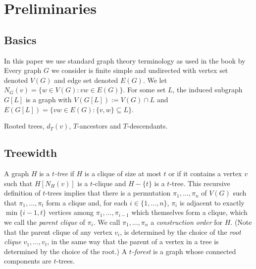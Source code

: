 \documentclass[kpfonts]{patmorin}
\newcommand{\uqs}{\chi_2}
\newcommand{\hus}{\hat{\chi}_2}
\theoremstyle{named}
\begin{document}
%
%
%

\section{Preliminaries}

\subsection{Basics}

In this paper we use standard graph theory terminology as used in the book by \citet{diestel:graph}
Every graph $G$ we consider is finite simple and undirected with vertex set denoted $V(G)$ and edge set denoted $E(G)$.  We let $N_G(v)=\{w\in V(G): vw\in E(G)\}$.  For some set $L$, the induced subgraph  $G[L]$ is a graph with $V(G[L]):=V(G)\cap L$ and $E(G[L])=\{vw\in E(G): \{v,w\}\subseteq L\}$.

Rooted trees, $d_T(v)$, $T$-ancestors and $T$-descendants.

\subsection{Treewidth}

A graph $H$ is a \emph{$t$-tree} if $H$ is a clique of size at most $t$ or if it contains a vertex $v$ such that $H[N_H(v)]$ is a $t$-clique and $H-\{t\}$ is a $t$-tree.  This recursive definition of $t$-trees implies that there is a permutation $\pi_1,\ldots,\pi_n$ of $V(G)$ such that $\pi_1,\ldots,\pi_t$ form a clique and, for each $i\in\{1,\ldots,n\}$, $\pi_i$ is adjacent to exactly $\min\{i-1,t\}$ vertices among $\pi_1,\ldots,\pi_{i-1}$ which themselves form a clique, which we call the \emph{parent clique} of $\pi_i$.  We call $\pi_1,\ldots,\pi_n$ a \emph{construction order} for $H$.  (Note that the parent clique of any vertex $v_i$, is determined by the choice of the \emph{root clique} $v_1,\ldots,v_t$, in the same way that the parent of a vertex in a tree is determined by the choice of the root.)  A \emph{$t$-forest} is a graph whose connected components are $t$-trees.
\end{document}
